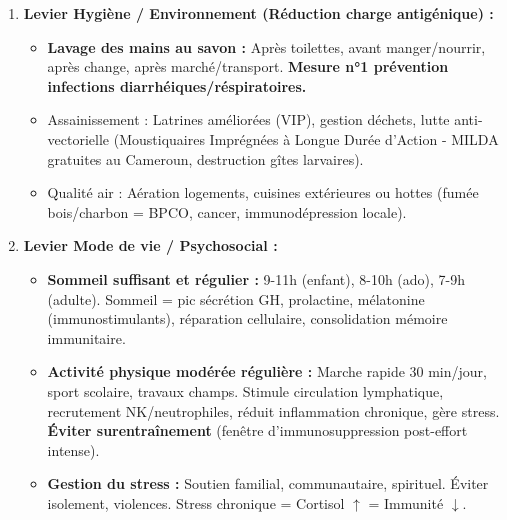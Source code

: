 \documentclass[11pt]{article}
\begin{document}
\begin{methode}
\begin{enumerate}
\begin{itemize}
            \item Respect strict du \textbf{Calendrier PEV Cameroun} (enfants 0-23 mois, filles 9-14 ans HPV, femmes enceintes VAT/VAT2, COVID-19).
            \item Rattrapage vaccinal si retard. Carte de vaccination tenue à jour (preuve pour école, voyage).
            \item Vaccins recommandés hors PEV selon risque : Méningocoque (Nord, pèlerins), Fièvre typhoïde, Hépatite A, Rage (post-exposition), Choléra (zones endémiques), Grippe saisonnière (personnes à risque).
        \end{itemize}
        \item \textbf{Levier Hygiène / Environnement (Réduction charge antigénique) :}
        \begin{itemize}
            \item \textbf{Lavage des mains au savon :} Après toilettes, avant manger/nourrir, après change, après marché/transport. \textbf{Mesure n°1 prévention infections diarrhéiques/réspiratoires.}
            \item Assainissement : Latrines améliorées (VIP), gestion déchets, lutte anti-vectorielle (Moustiquaires Imprégnées à Longue Durée d'Action - MILDA gratuites au Cameroun, destruction gîtes larvaires).
            \item Qualité air : Aération logements, cuisines extérieures ou hottes (fumée bois/charbon = BPCO, cancer, immunodépression locale).
        \end{itemize}
        \item \textbf{Levier Mode de vie / Psychosocial :}
        \begin{itemize}
            \item \textbf{Sommeil suffisant et régulier :} 9-11h (enfant), 8-10h (ado), 7-9h (adulte). Sommeil = pic sécrétion GH, prolactine, mélatonine (immunostimulants), réparation cellulaire, consolidation mémoire immunitaire.
            \item \textbf{Activité physique modérée régulière :} Marche rapide 30 min/jour, sport scolaire, travaux champs. Stimule circulation lymphatique, recrutement NK/neutrophiles, réduit inflammation chronique, gère stress. \textbf{Éviter surentraînement} (fenêtre d'immunosuppression post-effort intense).
            \item \textbf{Gestion du stress :} Soutien familial, communautaire, spirituel. Éviter isolement, violences. Stress chronique = Cortisol $\uparrow$ = Immunité $\downarrow$.

\end{itemize}
\end{enumerate}
\end{methode}
\end{document}
